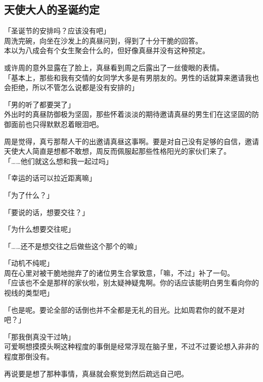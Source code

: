 \subsection{天使大人的圣诞约定}

「圣诞节的安排吗？应该没有吧」\\

周洗完碗，向坐在沙发上的真昼问到，得到了十分干脆的回答。\\

本以为八成会有个女生聚会什么的，但好像真昼并没有这种预定。

或许周的意外显露在了脸上，真昼看到周之后露出了一丝傻眼的表情。\\

「基本上，那些和我有交情的女同学大多是有男朋友的。男性的话就算来邀请我也会拒绝，所以不管怎么说都是没有安排的」

「男的听了都要哭了」\\

外出时的真昼防御极为坚固，那些怀着淡淡的期待邀请真昼的男生们在这坚固的防御面前也只得默默忍着眼泪吧。

周是觉得，真亏那帮人干的出邀请真昼这事啊。要是对自己没有足够的自信，邀请天使大人简直是想都不敢想，周反而佩服起那些性格阳光的家伙们来了。\\

「……他们就这么想和我一起过吗」

「幸运的话可以拉近距离嘛」

「为了什么？」

「要说的话，想要交往？」

「为什么想要交往呢」

「……还不是想交往之后做些这个那个的嘛」

「动机不纯呢」\\

周在心里对被干脆地抛弃了的诸位男生合掌致意，「嘛，不过」补了一句。\\

「应该也不全是那样的家伙啦，别太疑神疑鬼啊。你的话应该能明白男生看向你的视线的类型吧」

「也是呢。要论全部的话倒也并不全都是无礼的目光。比如周君你的就不是对吧？」

「那我倒真没干过呐」\\

可爱啊想摸摸头啊这种程度的事倒是经常浮现在脑子里，不过不过要论想入非非的程度那倒没有。

再说要是想了那种事情，真昼就会察觉到然后疏远自己吧。\\


